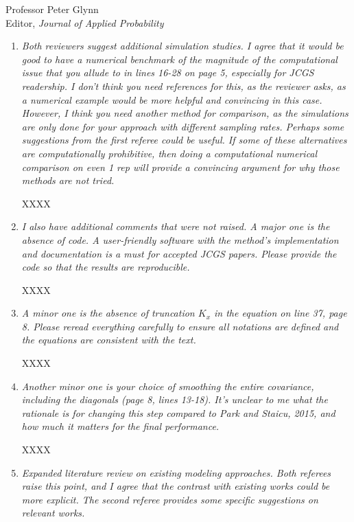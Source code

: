 \documentclass[11pt]{letter} %
\begin{document}
\begin{letter}{Professor
	Peter Glynn\\
	Editor, {\em Journal of Applied Probability}}
\begin{enumerate}
\item {\it Both reviewers suggest additional simulation studies. I agree that it would be good to have a numerical benchmark of the magnitude of the computational issue that you allude to in lines 16-28 on page 5, especially for JCGS readership. I don’t think you need references for this, as the reviewer asks, as a numerical example would be more helpful and convincing in this case. However, I think you need another method for comparison, as the simulations are only done for your approach with different sampling rates. Perhaps some suggestions from the first referee could be useful. If some of these alternatives are computationally prohibitive, then doing a computational numerical comparison on even 1 rep will provide a convincing argument for why those methods are not tried.}

\vspace{5mm}
XXXX
\vspace{5mm}

\item {\it I also have additional comments that were not raised. A major one is the absence of code. A user-friendly software with the method’s implementation and documentation is a must for accepted JCGS papers. Please provide the code so that the results are reproducible.}

\vspace{5mm}
XXXX
\vspace{5mm}

\item {\it
A minor one is the absence of truncation $K_x$ in the equation on line 37, page 8. Please reread everything carefully to ensure all notations are defined and the equations are consistent with the text.}

\vspace{5mm}
XXXX
\vspace{5mm}

\item {\it Another minor one is your choice of smoothing the entire covariance, including the diagonals (page 8, lines 13-18). It’s unclear to me what the rationale is for changing this step compared to Park and Staicu, 2015, and how much it matters for the final performance.}

\vspace{5mm}
XXXX
\vspace{5mm}

\item {\it Expanded literature review on existing modeling approaches. Both referees raise this point, and I agree that the contrast with existing works could be more explicit. The second referee provides some specific suggestions on relevant works.}


\end{enumerate}
\end{letter}
\end{document}
